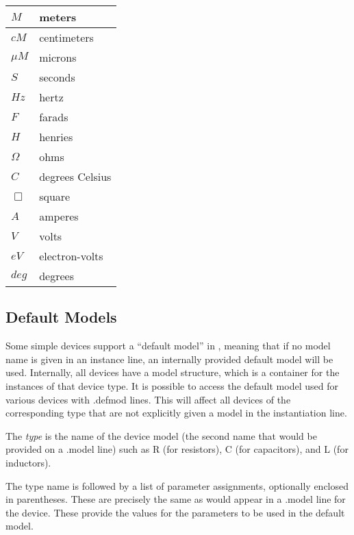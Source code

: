 \begin{tabular}{|l|l|}\hline
$M$       &  meters\\ \hline
$cM$      &  centimeters\\ \hline
${\mu}M$  &  microns\\ \hline
$S$       &  seconds\\ \hline
$Hz$      &  hertz\\ \hline
$F$       &  farads\\ \hline
$H$       &  henries\\ \hline
$\Omega$  &  ohms\\ \hline
$C$       &  degrees Celsius\\ \hline
$\Box$    &  square\\ \hline
$A$       &  amperes\\ \hline
$V$       &  volts\\ \hline
$eV$      &  electron-volts\\ \hline
$deg$     &  degrees\\ \hline
\end{tabular}


\subsection{Default Models}


Some simple devices support a ``default model'' in {\WRspice}, meaning
that if no model name is given in an instance line, an internally
provided default model will be used.  Internally, all devices have a
model structure, which is a container for the instances of that device
type.  It is possible to access the default model used for various
devices with {\vt .defmod} lines.  This will affect all devices of the
corresponding type that are not explicitly given a model in the
instantiation line.


The {\it type} is the name of the device model (the second name that
would be provided on a {\vt .model} line) such as {\vt R} (for
resistors), {\vt C} (for capacitors), and {\vt L} (for inductors).

The type name is followed by a list of parameter assignments,
optionally enclosed in parentheses.  These are precisely the same as
would appear in a {\vt .model} line for the device.  These provide the
values for the parameters to be used in the default model.

